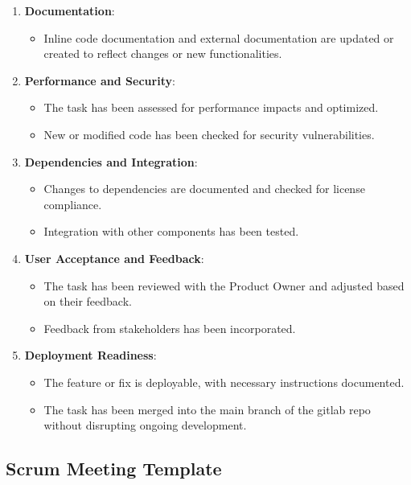 \documentclass[11pt,a4paper]{article}
\begin{document}
\begin{enumerate}
        \item \textbf{Documentation}:
        \begin{itemize}
            \item Inline code documentation and external documentation are updated or created to reflect changes or new functionalities.
        \end{itemize}

        \item \textbf{Performance and Security}:
        \begin{itemize}
            \item The task has been assessed for performance impacts and optimized.
            \item New or modified code has been checked for security vulnerabilities.
        \end{itemize}

        \item \textbf{Dependencies and Integration}:
        \begin{itemize}
            \item Changes to dependencies are documented and checked for license compliance.
            \item Integration with other components has been tested.
        \end{itemize}

        \item \textbf{User Acceptance and Feedback}:
        \begin{itemize}
            \item The task has been reviewed with the Product Owner and adjusted based on their feedback.
            \item Feedback from stakeholders has been incorporated.
        \end{itemize}

        \item \textbf{Deployment Readiness}:
        \begin{itemize}
            \item The feature or fix is deployable, with necessary instructions documented.
            \item The task has been merged into the main branch of the gitlab repo without disrupting ongoing development.
        \end{itemize}
    \end{enumerate}

    \subsection{Scrum Meeting Template}\label{subsec:scrum-meeting-template}
\end{document}
